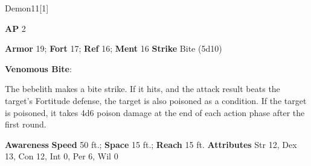 \begin{monsection}[Bebelith]{Demon}{11}[1]
\vspace{-1em}\vspace{-1em}
\begin{spellcontent}
\begin{spelltargetinginfo}
{\textbf{AP} 2}

\pari \textbf{Armor} 19;
\textbf{Fort} 17;
\textbf{Ref} 16;
\textbf{Ment} 16
\pari \textbf{Strike} Bite  (5d10)



\end{spelltargetinginfo}


\begin{spelleffects}

\pari
\textbf{Venomous Bite}:

The bebelith makes a bite strike.
If it hits, and the attack result beats the target's Fortitude defense, the target is also poisoned as a condition.
If the target is poisoned, it takes 4d6 poison damage at the end of each action phase after the first round.




\end{spelleffects}

\end{spellcontent}

\begin{monsterfooter}
\pari \textbf{Awareness} 
\pari \textbf{Speed} 50 ft.;
\textbf{Space} 15 ft.;
\textbf{Reach} 15 ft.
\pari \textbf{Attributes}
Str 12,
Dex 13,
Con 12,
Int 0,
Per 6,
Wil 0
\end{monsterfooter}
\end{monsection}



